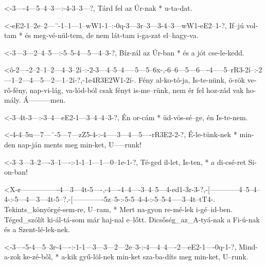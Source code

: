   {<-3----4---5--4--3---:-4-3--3---?,}
  {  Tárd fel az Úr-nak * u-ta-dat.}

  {<-eE2-1--2e--2---¨-1--1---1--wW1-1--:-0q-3---3r--3---3-4--3---wW1-eE2--1-?,}
  {  If--jú vol-tam * és meg-vé-nül-tem, de nem lát-tam i-ga-zat el--hagy-va.}

  {<-3---3---2--4--5---:-5--5-4---5---4--3-?,}
  {  Bíz-zál az Úr-ban * és a jót cse-le-kedd.}


  {<ô-2----2--2--1--2---4--3--2í--:-2-3---4--5--4-----5---5--6x-,-6--6---5---6----4-----5--rR3-2í--:-2---1--2---4---5---2---1--2í-?,-1e4R3E2W1-2í-.}
  {   Fény al-ko-tó-ja, Is-te-nünk, ö-rök ve-rő-fény, nap-vi-lág, va-lód-ból csak fényt is-me--rünk, nem ér fel hoz-zád vak ho-mály. Á---------men.}

  {<-3--4t-3---:-3--4---eE2-1---3--4--4--3-?,}
  {  Én or-cám * üd-vös-sé--ge, én Is-te-nem.}

  {<-4-4--5u---7---¨-5---7---zZ5-4-:-4-----3---4---5----rR3E2-2-?,}
  {  É-le-tünk-nek * min-den nap-ján ments meg min-ket, U-----runk!}

  {<-3--3---3--2----3--1----:-1-1--1---1---0--1e-1-?,}
  {  Té-ged il-let, Is-ten, * a di-csé-ret Si-on-ban!}

  {<X-¢----------------4---3---4t-5----,-4----4--4----3--4--5---4-ed1-3r-3-?,-[------------4--5--4--4-:-5---4---3---4t-5--?,-[-------------5z--5-:-5-5--4-4-:-5--5-4-----3--4t--tT4-.}
  {   Tekints_könyörgé-sem-re, U--ram, * Mert na-gyon re-mé-lek i-gé--id-ben. Téged_szólít ki-ál-tá-som már haj-nal e--lőtt. Dicsőség_az_A-tyá-nak a Fi-ú-nak és a Szent-lé-lek-nek.}

  {<-3----5-4---5--3r-4----:-1-1---3---3---2---2e--3-:-4---4--4----2---eE2-1----0q-1-?,}
  {  Mind-a-zok ke-zé-ből, * a-kik gyű-löl-nek min-ket sza-ba-díts meg min-ket, U--runk.}



